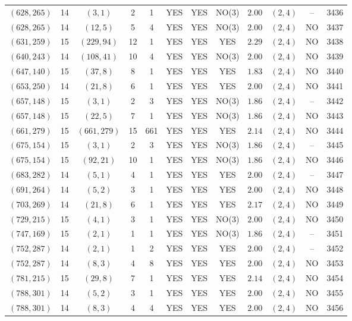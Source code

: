 \begin{longtable}{|c|c|c|c|c|c|c|c|c|c|c|c|}
$(628,265)$ & 14 & $(3,1)$ & 2 & 1 & YES & YES & NO(3) & $2.00$ & $(2,4)$ & -- & 3436\\
$(628,265)$ & 14 & $(12,5)$ & 5 & 4 & YES & YES & NO(3) & $2.00$ & $(2,4)$ & NO & 3437\\
$(631,259)$ & 15 & $(229,94)$ & 12 & 1 & YES & YES & YES & $2.29$ & $(2,4)$ & NO & 3438\\
$(640,243)$ & 14 & $(108,41)$ & 10 & 4 & YES & YES & NO(3) & $2.00$ & $(2,4)$ & NO & 3439\\
$(647,140)$ & 15 & $(37,8)$ & 8 & 1 & YES & YES & YES & $1.83$ & $(2,4)$ & NO & 3440\\
$(653,250)$ & 14 & $(21,8)$ & 6 & 1 & YES & YES & YES & $2.00$ & $(2,4)$ & NO & 3441\\
$(657,148)$ & 15 & $(3,1)$ & 2 & 3 & YES & YES & NO(3) & $1.86$ & $(2,4)$ & -- & 3442\\
$(657,148)$ & 15 & $(22,5)$ & 7 & 1 & YES & YES & NO(3) & $1.86$ & $(2,4)$ & NO & 3443\\
$(661,279)$ & 15 & $(661,279)$ & 15 & 661 & YES & YES & YES & $2.14$ & $(2,4)$ & NO & 3444\\
$(675,154)$ & 15 & $(3,1)$ & 2 & 3 & YES & YES & NO(3) & $1.86$ & $(2,4)$ & -- & 3445\\
$(675,154)$ & 15 & $(92,21)$ & 10 & 1 & YES & YES & NO(3) & $1.86$ & $(2,4)$ & NO & 3446\\
$(683,282)$ & 14 & $(5,1)$ & 4 & 1 & YES & YES & YES & $2.00$ & $(2,4)$ & -- & 3447\\
$(691,264)$ & 14 & $(5,2)$ & 3 & 1 & YES & YES & YES & $2.00$ & $(2,4)$ & NO & 3448\\
$(703,269)$ & 14 & $(21,8)$ & 6 & 1 & YES & YES & YES & $2.17$ & $(2,4)$ & NO & 3449\\
$(729,215)$ & 15 & $(4,1)$ & 3 & 1 & YES & YES & NO(3) & $2.00$ & $(2,4)$ & NO & 3450\\
$(747,169)$ & 15 & $(2,1)$ & 1 & 1 & YES & YES & NO(3) & $1.86$ & $(2,4)$ & -- & 3451\\
$(752,287)$ & 14 & $(2,1)$ & 1 & 2 & YES & YES & YES & $2.00$ & $(2,4)$ & -- & 3452\\
$(752,287)$ & 14 & $(8,3)$ & 4 & 8 & YES & YES & YES & $2.00$ & $(2,4)$ & NO & 3453\\
$(781,215)$ & 15 & $(29,8)$ & 7 & 1 & YES & YES & YES & $2.14$ & $(2,4)$ & NO & 3454\\
$(788,301)$ & 14 & $(5,2)$ & 3 & 1 & YES & YES & YES & $2.00$ & $(2,4)$ & NO & 3455\\
$(788,301)$ & 14 & $(8,3)$ & 4 & 4 & YES & YES & YES & $2.00$ & $(2,4)$ & NO & 3456\\

\end{longtable}
